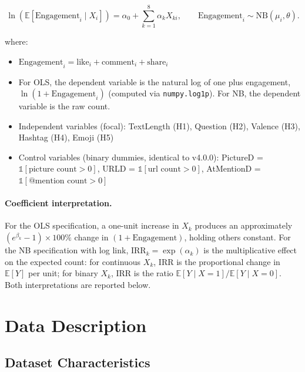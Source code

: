 \documentclass[12pt,a4paper]{article}
\begin{document}
\begin{equation}
\ln(\mathbb{E}[\text{Engagement}_i \mid X_i]) = \alpha_0 + \sum_{k=1}^{8}\alpha_k X_{ki},\qquad \text{Engagement}_i \sim \text{NB}(\mu_i, \theta).
\end{equation}

where:
\begin{itemize}
    \item $\text{Engagement}_i = \text{like}_i + \text{comment}_i + \text{share}_i$
    \item For OLS, the dependent variable is the natural log of one plus engagement, $\ln(1 + \text{Engagement}_i)$ (computed via \texttt{numpy.log1p}). For NB, the dependent variable is the raw count.
    \item Independent variables (focal): TextLength (H1), Question (H2), Valence (H3), Hashtag (H4), Emoji (H5)
    \item Control variables (binary dummies, identical to v4.0.0): PictureD = $\mathbb{1}[\text{picture count}>0]$, URLD = $\mathbb{1}[\text{url count}>0]$, AtMentionD = $\mathbb{1}[\text{@mention count}>0]$
\end{itemize}

\paragraph{Coefficient interpretation.} For the OLS specification, a one-unit increase in $X_k$ produces an approximately $(e^{\beta_k}-1)\times 100\%$ change in $(1+\text{Engagement})$, holding others constant. For the NB specification with log link, $\text{IRR}_k = \exp(\alpha_k)$ is the multiplicative effect on the expected count: for continuous $X_k$, IRR is the proportional change in $\mathbb{E}[Y]$ per unit; for binary $X_k$, IRR is the ratio $\mathbb{E}[Y\mid X=1]/\mathbb{E}[Y\mid X=0]$. Both interpretations are reported below.

\section{Data Description}

\subsection{Dataset Characteristics}
\end{document}
